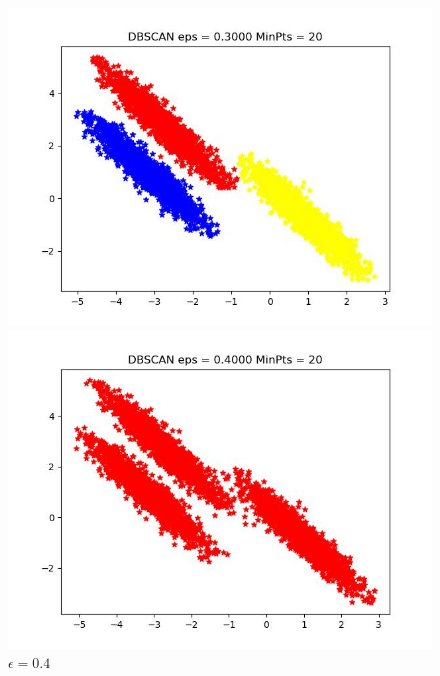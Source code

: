 \documentclass[UTF8]{ctexart}
\begin{document}
\begin{figure}[H]
\begin{minipage}{0.32\linewidth}
		\caption{$\epsilon=0.2$}
		\label{chutian2}%
	\end{minipage}
  \begin{minipage}{0.32\linewidth}
		\centering
		\includegraphics[width=0.9\linewidth]{data3-0.3.jpg}
		\caption{$\epsilon=0.3$}
		\label{chutian1}%
	\end{minipage}
	\begin{minipage}{0.32\linewidth}
		\centering
		\includegraphics[width=0.9\linewidth]{data3-0.4.jpg}
		\caption{$\epsilon=0.4$}
		\label{chutian2}%
	\end{minipage}
  \begin{minipage}{0.32\linewidth}
		\centering

\end{minipage}
\end{figure}
\end{document}

